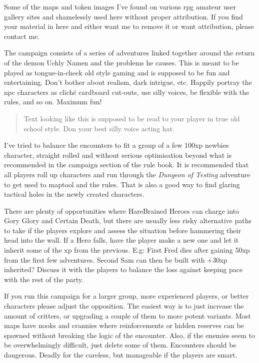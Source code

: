 \documentclass[11pt, twoside, titlepage, a4paper]{report}
\newenvironment{readoutloud}%
{\begin{quote}\begin{itshape}}%
{\end{itshape}\end{quote}}%
\begin{document}
Some of the maps and token images I've found on various rpg amateur user gallery sites and shamelessly used here without proper attribution. If you find your material in here and either want me to remove it or want attribution, please contact me.

The campaign consists of a series of adventures linked together around the return of the demon Uchly Namen and the problems he causes. This is meant to be played as tongue-in-cheek old style gaming and is supposed to be fun and entertaining. Don't bother about realism, dark intrigue, etc. Happily portray the npc characters as cliché cardboard cut-outs, use silly voices, be flexible with the rules, and so on. Maximum fun!

\begin{readoutloud}
Text looking like this is supposed to be read to your player in true old school style. Don your best silly voice acting hat.
\end{readoutloud}

I've tried to balance the encounters to fit a group of a few 100xp newbies character, straight rolled and without serious optimisation beyond what is recommended in the campaign section of the rule book.
It is recommended that all players roll up characters and run through the \emph{Dungeon of Testing} adventure to get used to maptool and the rules. That is also a good way to find glaring tactical holes in the newly created characters.

There are plenty of opportunities where HareBrained Heroes can charge into Gory Glory and Certain Death, but there are usually less risky alternative paths to take if the players explore and assess the situation before hammering their head into the wall. If a Hero falls, have the player make a new one and let it inherit some of the xp from the previous. E.g: First Fred dies after gaining 50xp from the first few adventures. Second Sam can then be built with +30xp inherited? Discuss it with the players to balance the loss against keeping pace with the rest of the party.

If you run this campaign for a larger group, more experienced players, or better characters please adjust the opposition. The easiest way is to just increase the amount of critters, or upgrading a couple of them to more potent variants. Most maps have nooks and crannies where reinforcements or hidden reserves can be spawned without breaking the logic of the encounter. Also, if the enemies seem to be overwhelmingly difficult, just delete some of them. Encounters should be dangerous. Deadly for the careless, but manageable if the players are smart.
\end{document}

